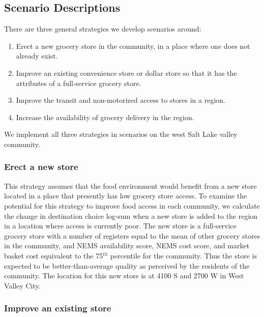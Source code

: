 \documentclass[
  letterpaper,
  number,
  review,
  3p]{elsarticle}
\providecommand{\tightlist}{%
  \setlength{\itemsep}{0pt}\setlength{\parskip}{0pt}}\usepackage{longtable,booktabs,array}
\begin{document}
\subsection{Scenario Descriptions}\label{scenario-descriptions}

There are three general strategies we develop scenarios around:

\begin{enumerate}
\def\labelenumi{\arabic{enumi}.}
\tightlist
\item
  Erect a new grocery store in the community, in a place where one does
  not already exist.
\item
  Improve an existing convenience store or dollar store so that it has
  the attributes of a full-service grocery store.
\item
  Improve the transit and non-motorized access to stores in a region.
\item
  Increase the availability of grocery delivery in the region.
\end{enumerate}

We implement all three strategies in scenarios on the west Salt Lake
valley community.

\subsubsection{Erect a new store}\label{erect-a-new-store}

This strategy assumes that the food environment would benefit from a new
store located in a place that presently has low grocery store access. To
examine the potential for this strategy to improve food access in each
community, we calculate the change in destination choice log-sum when a
new store is added to the region in a location where access is currently
poor. The new store is a full-service grocery store with a number of
registers equal to the mean of other grocery stores in the community,
and NEMS availability score, NEMS cost score, and market basket cost
equivalent to the 75\(^{th}\) percentile for the community. Thus the
store is expected to be better-than-average quality as perceived by the
residents of the community. The location for this new store is at 4100 S
and 2700 W in West Valley City.

\subsubsection{Improve an existing
store}\label{improve-an-existing-store}
\end{document}
